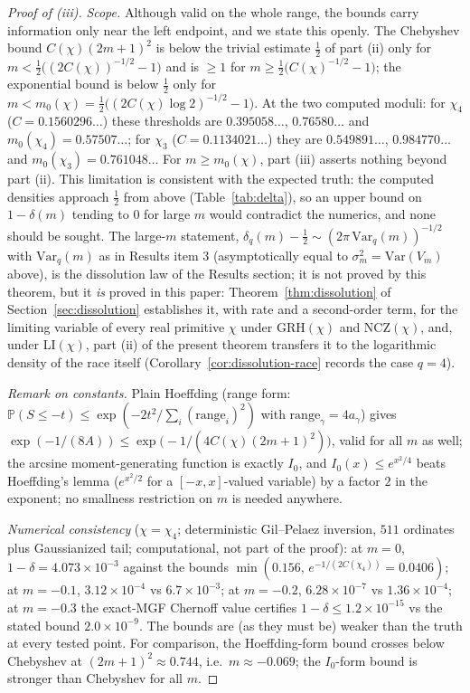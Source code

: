\documentclass[11pt]{article}
\begin{document}
\begin{proof}[Proof of (iii)]
\emph{Scope.} Although valid on the whole range, the bounds carry
information only near the left endpoint, and we state this openly.
The Chebyshev bound $C(\chi)(2m+1)^2$ is below the
trivial estimate $\tfrac12$ of part (ii) only for
$m<\tfrac12\bigl((2C(\chi))^{-1/2}-1\bigr)$ and is $\ge1$ for
$m\ge\tfrac12\bigl(C(\chi)^{-1/2}-1\bigr)$; the exponential
bound is below $\tfrac12$ only for
$m<m_0(\chi)=\tfrac12\bigl((2C(\chi)\log2)^{-1/2}-1\bigr)$. At the two
computed moduli: for $\chi_4$ ($C=0.1560296\ldots$) these thresholds
are $0.395058\ldots$, $0.76580\ldots$ and $m_0(\chi_4)=0.57507\ldots$;
for $\chi_3$ ($C=0.1134021\ldots$) they are $0.549891\ldots$,
$0.984770\ldots$ and $m_0(\chi_3)=0.761048\ldots$ For
$m\ge m_0(\chi)$, part (iii) asserts nothing beyond part (ii). This
limitation is consistent with the expected truth: the computed
densities approach $\tfrac12$ from above (Table~\ref{tab:delta}), so an
upper bound on $1-\delta(m)$ tending to $0$ for large $m$ would
contradict the numerics, and none should be sought. The large-$m$
statement,
$\delta_q(m)-\tfrac12\sim(2\pi\,\mathrm{Var}_q(m))^{-1/2}$ with
$\mathrm{Var}_q(m)$ as in Results item 3 (asymptotically equal to
$\sigma_m^2=\mathrm{Var}(V_m)$ above), is the
dissolution law of the Results section; it is not proved by this
theorem, but it \emph{is} proved in this paper:
Theorem~\ref{thm:dissolution} of Section~\ref{sec:dissolution}
establishes it, with rate and a second-order term, for the limiting
variable of every real primitive $\chi$ under GRH$(\chi)$ and
NCZ$(\chi)$, and, under LI$(\chi)$, part (ii) of the present theorem
transfers it to the logarithmic density of the race itself
(Corollary~\ref{cor:dissolution-race} records the case $q=4$).

\emph{Remark on constants.} Plain Hoeffding (range form:
$\mathbb P(S\le-t)\le\exp(-2t^2/\sum_i(\text{range}_i)^2)$ with
$\mathrm{range}_\gamma=4a_\gamma$) gives
$\exp(-1/(8A))\le\exp\bigl(-1/(4C(\chi)(2m+1)^2)\bigr)$, valid for all
$m$ as
well; the arcsine moment-generating function is exactly $I_0$, and
$I_0(x)\le e^{x^2/4}$ beats Hoeffding's lemma
($e^{x^2/2}$ for a $[-x,x]$-valued variable) by a factor $2$ in the
exponent; no smallness restriction on $m$ is needed anywhere.

\emph{Numerical consistency} ($\chi=\chi_4$; deterministic
Gil--Pelaez inversion, $511$
ordinates plus Gaussianized tail; computational, not part of the
proof): at $m=0$, $1-\delta=4.073\times10^{-3}$ against the bounds
$\min(0.156,\,e^{-1/(2C(\chi_4))}=0.0406)$; at $m=-0.1$,
$3.12\times10^{-4}$ vs $6.7\times10^{-3}$; at $m=-0.2$,
$6.28\times10^{-7}$ vs $1.36\times10^{-4}$; at $m=-0.3$ the exact-MGF
Chernoff value certifies $1-\delta\le1.2\times10^{-15}$ vs the stated
bound $2.0\times10^{-9}$. The bounds are (as they must be) weaker than
the truth at every tested point. For comparison, the Hoeffding-form
bound crosses below Chebyshev at $(2m+1)^2\approx0.744$, i.e.\
$m\approx-0.069$; the $I_0$-form bound is stronger than Chebyshev for
all $m$.
\end{proof}
\end{document}

